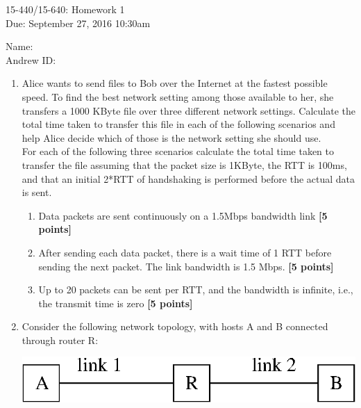 \documentclass{article}
\newcommand{\mycoursenum}{15-440/15-640}
\newcommand{\myhwnum}{1}
\newcommand{\myname}{}   %
\newcommand{\myandrew}{}  %
\newif\ifprint
\begin{document}
\medskip
\thispagestyle{plain}
\begin{center}
{\Large \mycoursenum: Homework \myhwnum}\\
Due: September 27, 2016 10:30am \\
\medskip
\ifprint
Name: \rule{0.5\textwidth}{.4pt} \\
Andrew ID: \rule{0.45\textwidth}{.4pt} \\
\else
Name: \myname \\
Andrew ID: \myandrew \\
\fi
\end{center}

\begin{enumerate}

\item Alice wants to send files to Bob over the Internet at the fastest possible speed. To find the best network setting among those available to her, she transfers a 1000 KByte file over three different network settings. Calculate the total time taken to transfer this file in each of the following scenarios and help Alice decide which of those is the network setting she should use.\\
For each of the following three scenarios calculate the total time taken to transfer the file assuming that the packet size is 1KByte, the RTT is 100ms, and that an initial 2*RTT of handshaking is performed before the actual data is sent.
    \begin{enumerate}
    \item Data packets are sent continuously on a 1.5Mbps bandwidth link \textbf{[5 points]}
    \item After sending each data packet, there is a wait time of 1 RTT before sending the next packet. The link bandwidth is 1.5 Mbps. \textbf{[5 points]}
    \item Up to 20 packets can be sent per RTT, and the bandwidth is infinite, i.e., the transmit time is zero \textbf{[5 points]}   
    \end{enumerate}

\item Consider the following network topology, with hosts A and B connected through router R: 

\vspace{0.25in}
\begin{center}
\includegraphics[width=.4\textwidth]{sh_flow_control.eps}
\end{center}
\vspace{0.25in}


\end{enumerate}
\end{document}
